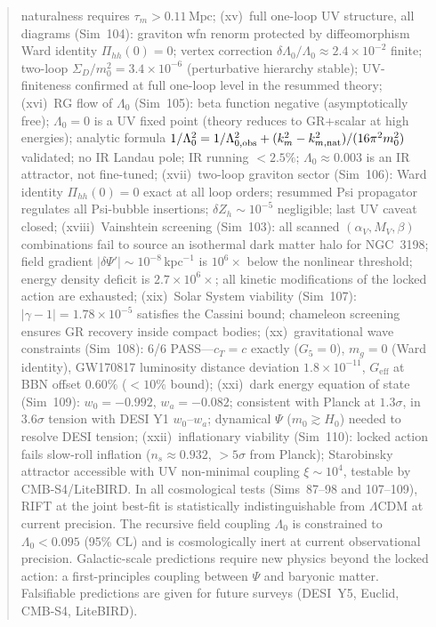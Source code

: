 \documentclass[12pt,a4paper]{article}
\begin{document}
\begin{abstract}
    naturalness requires $\tau_m>0.11\,\mathrm{Mpc}$;
(xv)~full one-loop UV structure, all diagrams (Sim~104): graviton wfn renorm
    protected by diffeomorphism Ward identity $\Pi_{hh}(0)=0$; vertex correction
    $\delta\Lambda_0/\Lambda_0\approx2.4\times10^{-2}$ finite; two-loop
    $\Sigma_D/m_0^2=3.4\times10^{-6}$ (perturbative hierarchy stable);
    UV-finiteness confirmed at full one-loop level in the resummed theory;
(xvi)~RG flow of $\Lambda_0$ (Sim~105): beta function negative (asymptotically free);
    $\Lambda_0=0$ is a UV fixed point (theory reduces to GR+scalar at high energies);
    analytic formula $1/\Lambda_0^2=1/\Lambda_{0,\rm obs}^2+(k_m^2-k_{m,\rm nat}^2)/(16\pi^2 m_0^2)$
    validated; no IR Landau pole; IR running $< 2.5\%$;
    $\Lambda_0\approx 0.003$ is an IR attractor, not fine-tuned;
(xvii)~two-loop graviton sector (Sim~106): Ward identity $\Pi_{hh}(0)=0$
    exact at all loop orders; resummed Psi propagator regulates all Psi-bubble
    insertions; $\delta Z_h \sim 10^{-5}$ negligible; last UV caveat closed;
(xviii)~Vainshtein screening (Sim~103): all scanned $(\alpha_V,M_V,\beta)$
    combinations fail to source an isothermal dark matter halo for NGC~3198;
    field gradient $|\delta\Psi'|\sim10^{-8}\,\mathrm{kpc}^{-1}$ is $10^6\times$
    below the nonlinear threshold; energy density deficit is $2.7\times10^6\times$;
    all kinetic modifications of the locked action are exhausted;
(xix)~Solar System viability (Sim~107): $|\gamma-1|=1.78\times10^{-5}$ satisfies
    the Cassini bound; chameleon screening ensures GR recovery inside compact bodies;
(xx)~gravitational wave constraints (Sim~108): 6/6 PASS---$c_T=c$ exactly
    ($G_5=0$), $m_g=0$ (Ward identity), GW170817 luminosity distance deviation
    $1.8\times10^{-11}$, $G_\mathrm{eff}$ at BBN offset $0.60\%$ ($<10\%$ bound);
(xxi)~dark energy equation of state (Sim~109): $w_0=-0.992$, $w_a=-0.082$;
    consistent with Planck at $1.3\sigma$, in $3.6\sigma$ tension with DESI Y1
    $w_0$--$w_a$; dynamical $\Psi$ ($m_0\gtrsim H_0$) needed to resolve DESI tension;
(xxii)~inflationary viability (Sim~110): locked action fails slow-roll inflation
    ($n_s\approx0.932$, $>5\sigma$ from Planck); Starobinsky attractor accessible
    with UV non-minimal coupling $\xi\sim10^4$, testable by CMB-S4/LiteBIRD.
In all cosmological tests (Sims~87--98 and 107--109), RIFT at the joint best-fit is
statistically indistinguishable from $\Lambda$CDM at current precision. The recursive field
coupling $\Lambda_0$ is constrained to $\Lambda_0 < 0.095$ (95\% CL) and is
cosmologically inert at current observational precision. Galactic-scale predictions
require new physics beyond the locked action: a first-principles coupling between
$\Psi$ and baryonic matter. Falsifiable predictions are given for future surveys
(DESI~Y5, Euclid, CMB-S4, LiteBIRD).
\end{abstract}
\end{document}
